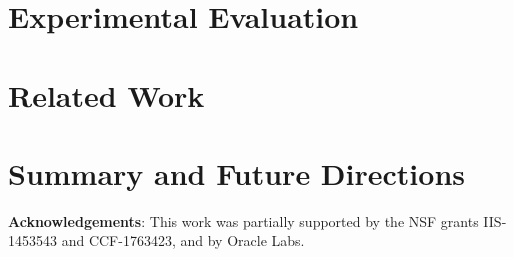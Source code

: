 \documentclass[sigconf]{acmart}
\begin{document}
\section{Experimental Evaluation}\label{sec:experiments}


\section{Related Work}\label{sec:applications}


\section{Summary and Future Directions}\label{discussion}


\smallskip

{\noindent \textbf{Acknowledgements}: This work was partially
supported by the NSF grants IIS-1453543 and CCF-1763423, and by Oracle Labs.}

\balance



\ifTechRep
\appendix

\fi 
\end{document}
